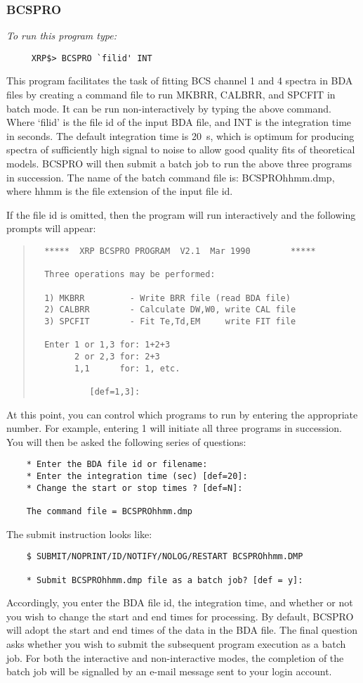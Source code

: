 \subsubsection{BCSPRO}

{\em To run this program type:}
\begin{verbatim}
     XRP$> BCSPRO `filid' INT                       
\end{verbatim}   
This program facilitates the task of fitting BCS channel 1 and 4 spectra in BDA
files by creating a command file to run MKBRR, CALBRR, and SPCFIT in batch
mode. It can be run non-interactively by typing the above command.
Where `filid' is the file id of the input BDA file, and INT is the
integration time in seconds. The default integration time is 20~s, which is
optimum for producing spectra of sufficiently high signal to noise to allow
good quality fits of theoretical models.  BCSPRO will then submit a batch job
to run the above three programs in succession. The name of the batch command
file is: BCSPROhhmm.dmp, where hhmm is the file extension of the input file id.

If the file id is omitted, then the program will run interactively
and the following prompts will appear:
\begin{quote}
\begin{verbatim}
  *****  XRP BCSPRO PROGRAM  V2.1  Mar 1990        *****

  Three operations may be performed:

  1) MKBRR         - Write BRR file (read BDA file)
  2) CALBRR        - Calculate DW,W0, write CAL file
  3) SPCFIT        - Fit Te,Td,EM     write FIT file

  Enter 1 or 1,3 for: 1+2+3
        2 or 2,3 for: 2+3
        1,1      for: 1, etc.

           [def=1,3]:
\end{verbatim}
\end{quote}
At this point, you can control which programs to run by entering the
appropriate number. For example, entering 1 will initiate all three programs in
succession. You will then be asked the following series of questions:
\begin{verbatim}
    * Enter the BDA file id or filename:
    * Enter the integration time (sec) [def=20]:
    * Change the start or stop times ? [def=N]:

    The command file = BCSPROhhmm.dmp
\end{verbatim}
The submit instruction looks like:
\begin{verbatim}
    $ SUBMIT/NOPRINT/ID/NOTIFY/NOLOG/RESTART BCSPROhhmm.DMP

    * Submit BCSPROhhmm.dmp file as a batch job? [def = y]:
\end{verbatim}
Accordingly, you enter the BDA file id, the integration time,  and
whether or not you wish to change the start and end times for processing.  By
default, BCSPRO will adopt the start and end times of the data in the BDA file.
The final question asks whether you wish to submit the subsequent program
execution as a batch job. For both the interactive and non-interactive modes,
the completion of the batch job will be signalled by an e-mail message sent to
your login account.

